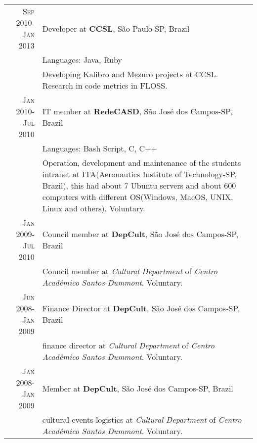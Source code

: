 \documentclass[a4paper,10pt]{article} %
\begin{document}
\begin{tabular}{r|p{11cm}}

\textsc{Sep 2010-Jan 2013} & Developer at \textbf{CCSL}, São Paulo-SP, Brazil \emph{}\\
& \footnotesize{Languages: Java, Ruby}\\
       & \footnotesize{Developing Kalibro and Mezuro projects at CCSL. Research in code metrics in FLOSS.}
\multicolumn{2}{c}{} \\


\textsc{Jan 2010-Jul 2010} & IT member at \textbf{RedeCASD}, São José dos Campos-SP, Brazil \emph{}\\
& \footnotesize{Languages: Bash Script, C, C++}\\
       & \footnotesize{Operation, development and maintenance of the students intranet at ITA(Aeronautics Institute of
       Technology-SP, Brazil), this had about 7 Ubuntu servers and about 600 computers with different
       OS(Windows, MacOS, UNIX, Linux and others). Voluntary.}
\multicolumn{2}{c}{} \\


\textsc{Jan 2009-Jul 2010} & Council member at \textbf{DepCult}, São José dos Campos-SP, Brazil \emph{}\\
& \footnotesize{Council member at \emph{Cultural Department} of 
       \emph{Centro Acad\^{e}mico Santos Dummont}. Voluntary.}
\multicolumn{2}{c}{} \\



\textsc{Jun 2008-Jan 2009} & Finance Director at \textbf{DepCult}, São José dos Campos-SP, Brazil \emph{}\\
& \footnotesize{finance director at \emph{Cultural Department} of 
       \emph{Centro Acad\^{e}mico Santos Dummont}. Voluntary.}
\multicolumn{2}{c}{}\\



\textsc{Jan 2008-Jan 2009} & Member at \textbf{DepCult}, São José dos Campos-SP, Brazil \emph{}\\
& \footnotesize{cultural events logistics at \emph{Cultural Department} of \emph{Centro Acad\^{e}mico Santos Dummont}. Voluntary.}\\

\end{tabular}
\end{document}

